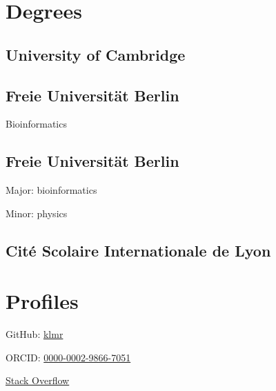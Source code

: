 \documentclass{klmr-cv}
\author{Konrad Rudolph}
\begin{document}
\maketitle

\sidebar

\section{Degrees}

\subsection{University of Cambridge}

\date{2016}
\item{}

\subsection{Freie Universität Berlin}

\date{2011}
\item{}
\item{Bioinformatics}

\subsection{Freie Universität Berlin}

\date{2008}
\item{}
\item{Major: bioinformatics}
\item{Minor: physics}

\subsection{\textfrench{Cité Scolaire Internationale de Lyon}}

\date{2003}
\item{}

\section{Profiles}

\item{GitHub: \href{http://github.com/klmr}{klmr}}
\item{ORCID: \href{http://orcid.org/0000-0002-9866-7051}{0000-0002-9866-7051}}
\item{\href{http://stackoverflow.com/users/1968/konrad-rudolph}{Stack Overflow}}
\end{document}
